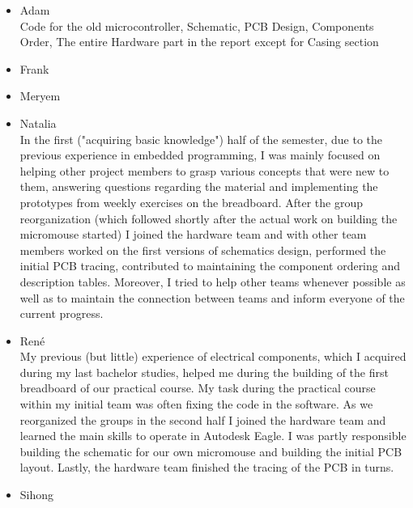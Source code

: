 \documentclass[12pt]{article}
\begin{document}
\begin{itemize}
    \item Adam\\
        Code for the old microcontroller, Schematic, PCB Design, Components Order, The entire Hardware part in the report except for Casing section
    \item Frank\\
    \item Meryem\\
    \item Natalia\\
        In the first ("acquiring basic knowledge") half of the semester, due to the previous experience in embedded programming, I was mainly focused on helping other project members to grasp various concepts that were new to them, answering questions regarding the material and implementing the prototypes from weekly exercises on the breadboard.
        After the group reorganization (which followed shortly after the actual work on building the micromouse started) I joined the hardware team and with other team members worked on the first versions of schematics design, performed the initial PCB tracing, contributed to maintaining the component ordering and description tables. 
        Moreover, I tried to help other teams whenever possible as well as to maintain the connection between teams and inform everyone of the current progress.
    \item René\\
         My previous (but little) experience of electrical components, which I acquired during my last bachelor studies, helped me during the building of the first breadboard of our practical course. My task during the practical course within my initial team was often fixing the code in the software. As we reorganized the groups in the second half I joined the hardware team and learned the main skills to operate in Autodesk Eagle. I was partly responsible building the schematic for our own micromouse and building the initial PCB layout. Lastly, the hardware team finished the tracing of the PCB in turns.
    \item Sihong\\
\end{itemize}


\newpage

\tableofcontents
\end{document}
